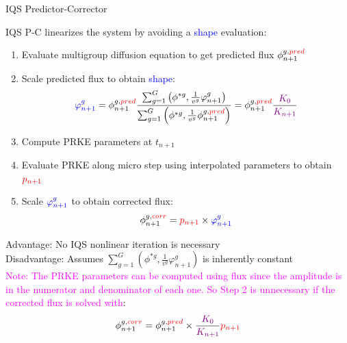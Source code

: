 \documentclass[8pt]{beamer}
\newcommand{\ben}{\begin{enumerate}}
\newcommand{\een}{\end{enumerate}}
\newcommand{\tcr}[1]{\textcolor{red}{#1}}
\newcommand{\tcb}[1]{\textcolor{blue}{#1}}
\newcommand{\tcm}[1]{\textcolor{magenta}{#1}}
\newcommand{\tcp}[1]{\textcolor{violet}{#1}}
\begin{document}
\begin{frame}{IQS Predictor-Corrector}

IQS P-C linearizes the system by avoiding a \tcb{shape} evaluation: 
\ben
\item Evaluate multigroup diffusion equation to get predicted flux $\phi_{n+1}^{g,\tcr{pred}}$
\item Scale predicted flux to obtain \tcb{shape}:
\[
\tcb{\varphi^{g}_{n+1}} = \phi_{n+1}^{g,\tcr{pred}} \frac{\sum_{g=1}^G\left(\phi^{*g},\frac{1}{v^g}\varphi^g_{n+1}\right)}{\sum_{g=1}^G \left(\phi^{*g},\frac{1}{v^g}\phi_{n+1}^{g,\tcr{pred}}\right)} = \phi_{n+1}^{g,\tcr{pred}} \frac{\tcp{K_0}}{\tcp{K_{n+1}}}
\]
\item Compute PRKE parameters at $t_{n+1}$
\item Evaluate PRKE along micro step using interpolated parameters to obtain $\tcr{p_{n+1}}$
\item Scale $\tcb{\varphi^{g}_{n+1}}$ to obtain corrected flux:
\[
\phi_{n+1}^{g,\tcr{corr}} = \tcr{p_{n+1}} \times \tcb{\varphi^{g}_{n+1}}
\]
\een

 Advantage: No IQS nonlinear iteration is necessary \\
 Disadvantage: Assumes $\sum_{g=1}^G\left(\phi^{*g},\frac{1}{v^g}\varphi^g_{n+1}\right)$ is inherently constant \\
\vspace{2mm}
\small \tcm{Note: The PRKE parameters can be computed using flux since the amplitude is in the numerator and denominator of each one. So Step 2 is unnecessary if the corrected flux is solved with}:
\[
\phi_{n+1}^{g,\tcr{corr}} = \phi_{n+1}^{g,\tcr{pred}} \times \frac{\tcp{K_0}}{\tcp{K_{n+1}}} \tcr{p_{n+1}}
\]
\normalsize

\end{frame}
\end{document}

